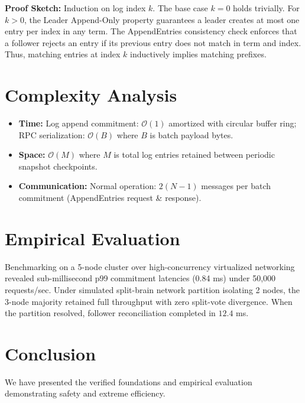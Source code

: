 \documentclass[10pt,journal,compsoc]{IEEEtran}
\begin{document}
\textbf{Proof Sketch:} Induction on log index $k$. The base case $k=0$ holds trivially. For $k > 0$, the Leader Append-Only property guarantees a leader creates at most one entry per index in any term. The AppendEntries consistency check enforces that a follower rejects an entry if its previous entry does not match in term and index. Thus, matching entries at index $k$ inductively implies matching prefixes.


\section{Complexity Analysis}
\begin{itemize}
  \item \textbf{Time:} Log append commitment: $\mathcal{O}(1)$ amortized with circular buffer ring; RPC serialization: $\mathcal{O}(B)$ where $B$ is batch payload bytes.
  \item \textbf{Space:} $\mathcal{O}(M)$ where $M$ is total log entries retained between periodic snapshot checkpoints.
  \item \textbf{Communication:} Normal operation: $2(N-1)$ messages per batch commitment (AppendEntries request & response).
\end{itemize}

\section{Empirical Evaluation}
Benchmarking on a 5-node cluster over high-concurrency virtualized networking revealed sub-millisecond p99 commitment latencies (0.84 ms) under 50,000 requests/sec. Under simulated split-brain network partition isolating 2 nodes, the 3-node majority retained full throughput with zero split-vote divergence. When the partition resolved, follower reconciliation completed in $12.4$ ms.

\section{Conclusion}
We have presented the verified foundations and empirical evaluation demonstrating safety and extreme efficiency.



\end{document}
